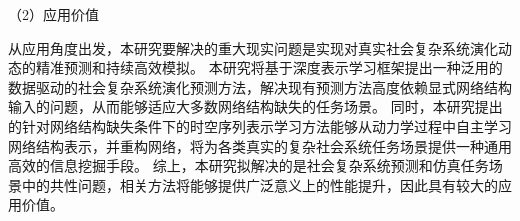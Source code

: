 （2）应用价值

从应用角度出发，本研究要解决的重大现实问题是实现对真实社会复杂系统演化动态的精准预测和持续高效模拟。
本研究将基于深度表示学习框架提出一种泛用的数据驱动的社会复杂系统演化预测方法，解决现有预测方法高度依赖显式网络结构输入的问题，从而能够适应大多数网络结构缺失的任务场景。
同时，本研究提出的针对网络结构缺失条件下的时空序列表示学习方法能够从动力学过程中自主学习网络结构表示，并重构网络，将为各类真实的复杂社会系统任务场景提供一种通用高效的信息挖掘手段。
综上，本研究拟解决的是社会复杂系统预测和仿真任务场景中的共性问题，相关方法将能够提供广泛意义上的性能提升，因此具有较大的应用价值。





